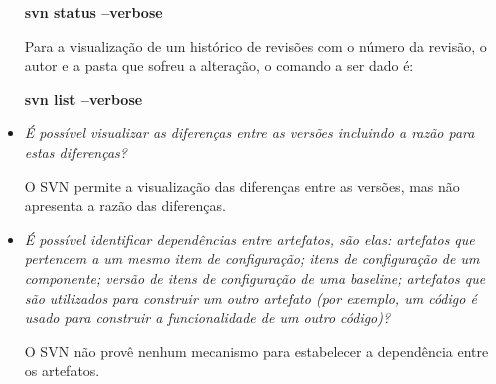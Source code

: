 \begin{itemize}
    \begin{centering}
    \colorbox{PineGreen}{
    \begin{minipage}{120px}
      \textbf{svn status --verbose}
    \end{minipage}
    }

    \end{centering} 

    Para a visualização de um histórico de revisões com o número da revisão, o autor e a pasta que sofreu a alteração, o comando a ser dado é:

     \begin{centering}
    \colorbox{PineGreen}{
    \begin{minipage}{120px}
      \textbf{svn list --verbose}
    \end{minipage}
    }

    \end{centering} 

  \item \textit{É possível visualizar as diferenças entre as versões incluindo a razão para estas 
  diferenças?}

      O SVN permite a visualização das diferenças entre as versões, mas não apresenta a razão das diferenças.
  
  \item \textit{É possível identificar dependências entre artefatos, são elas: artefatos que pertencem a um mesmo item de configuração; itens de configuração de um componente; versão de itens de configuração de uma baseline; artefatos que são utilizados para construir um outro artefato  (por exemplo, um código é usado para construir a funcionalidade de um outro código)?}
  
        O SVN não provê nenhum mecanismo para estabelecer a dependência entre os artefatos.


\end{itemize}
